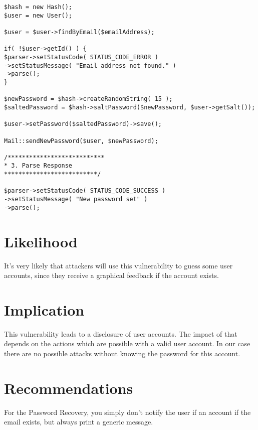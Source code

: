 \begin{lstlisting}[caption= Validating Email before generating new Passowrd  line 54-59 ,label=listing:forgotPassword]
$hash = new Hash();
$user = new User();

$user = $user->findByEmail($emailAddress);

if( !$user->getId() ) {
$parser->setStatusCode( STATUS_CODE_ERROR )
->setStatusMessage( "Email address not found." )
->parse();
}

$newPassword = $hash->createRandomString( 15 );
$saltedPassword = $hash->saltPassword($newPassword, $user->getSalt());

$user->setPassword($saltedPassword)->save();

Mail::sendNewPassword($user, $newPassword);

/***************************
* 3. Parse Response
**************************/

$parser->setStatusCode( STATUS_CODE_SUCCESS )
->setStatusMessage( "New password set" )
->parse();
\end{lstlisting}



\section{Likelihood}
It's very likely that attackers will use this vulnerability to guess some user accounts, since they receive a graphical feedback if the account exists.


\section{Implication} 
This vulnerability leads to a disclosure of user accounts. The impact of that depends on the actions which are possible with a valid user account. In our case there are no possible attacks without knowing the password for this account.


\section{Recommendations}
For the Password Recovery, you simply don't notify the user if an account if the email exists, but always print a generic message. 



